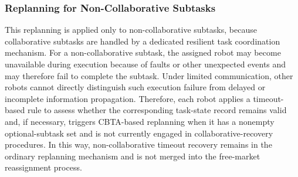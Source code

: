 \documentclass[lettersize,journal]{IEEEtran}
\begin{document}
\subsubsection{Replanning for Non-Collaborative Subtasks} \label{None}





This replanning is applied only to non-collaborative subtasks, because collaborative subtasks are handled by a dedicated resilient task coordination mechanism. For a non-collaborative subtask, the assigned robot may become unavailable during execution because of faults or other unexpected events and may therefore fail to complete the subtask. Under limited communication, other robots cannot directly distinguish such execution failure from delayed or incomplete information propagation. Therefore, each robot applies a timeout-based rule to assess whether the corresponding task-state record remains valid and, if necessary, triggers CBTA-based replanning when it has a nonempty optional-subtask set and is not currently engaged in collaborative-recovery procedures. In this way, non-collaborative timeout recovery remains in the ordinary replanning mechanism and is not merged into the free-market reassignment process.
\end{document}
